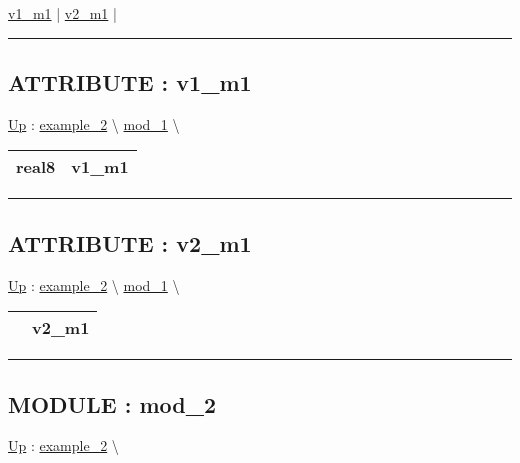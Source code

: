 \par


\hyperlink{ecldoc:example_2.mod_1.v1_m1}{v1\_m1}  |
\hyperlink{ecldoc:example_2.mod_1.v2_m1}{v2\_m1}  |

\rule{\linewidth}{0.5pt}

\subsection*{ATTRIBUTE : v1\_m1}
\hypertarget{ecldoc:example_2.mod_1.v1_m1}{}
\hyperlink{ecldoc:example_2.mod_1}{Up} :
\hspace{0pt} \hyperlink{ecldoc:example_2}{example_2} \textbackslash 
\hspace{0pt} \hyperlink{ecldoc:example_2.mod_1}{mod_1} \textbackslash 

{\renewcommand{\arraystretch}{1.5}
\begin{tabularx}{\textwidth}{|>{\raggedright\arraybackslash}l|X|}
\hline
\hspace{0pt}real8 & v1\_m1 \\
\hline
\end{tabularx}
}

\par


\rule{\linewidth}{0.5pt}
\subsection*{ATTRIBUTE : v2\_m1}
\hypertarget{ecldoc:example_2.mod_1.v2_m1}{}
\hyperlink{ecldoc:example_2.mod_1}{Up} :
\hspace{0pt} \hyperlink{ecldoc:example_2}{example_2} \textbackslash 
\hspace{0pt} \hyperlink{ecldoc:example_2.mod_1}{mod_1} \textbackslash 

{\renewcommand{\arraystretch}{1.5}
\begin{tabularx}{\textwidth}{|>{\raggedright\arraybackslash}l|X|}
\hline
\hspace{0pt} & v2\_m1 \\
\hline
\end{tabularx}
}

\par


\rule{\linewidth}{0.5pt}


\subsection*{MODULE : mod\_2}
\hypertarget{ecldoc:example_2.mod_2}{}
\hyperlink{ecldoc:example_2}{Up} :
\hspace{0pt} \hyperlink{ecldoc:example_2}{example_2} \textbackslash 

